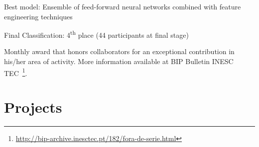 \documentclass{mycv}
\begin{document}
\begin{myitemize}
	\item Best model: Ensemble of feed-forward neural networks combined with feature engineering techniques
	\item Final Classification: 4\textsuperscript{th} place (44 participants at final stage)
\end{myitemize}


Monthly award that honors collaborators for an exceptional contribution in his/her area of activity. More information available at BIP Bulletin INESC TEC~\footnote{\url{http://bip-archive.inesctec.pt/182/fora-de-serie.html}}.



\pagebreak
\section{Projects}
\end{document}
